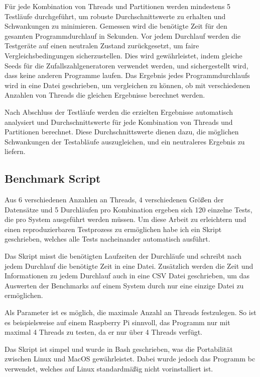 Für jede Kombination von Threads und Partitionen werden mindestens 5 Testläufe durchgeführt, um robuste Durchschnittswerte zu erhalten und Schwankungen zu minimieren. Gemessen wird die benötigte Zeit für den gesamten Programmdurchlauf in Sekunden. Vor jedem Durchlauf werden die Testgeräte auf einen neutralen Zustand zurückgesetzt, um faire Vergleichsbedingungen sicherzustellen. Dies wird gewährleistet, indem gleiche Seeds für die Zufallszahlgeneratoren verwendet werden, und sichergestellt wird, dass keine anderen Programme laufen.
Das Ergebnis jedes Programmdurchlaufs wird in eine Datei geschrieben, um vergleichen zu können, ob mit verschiedenen Anzahlen von Threads die gleichen Ergebnisse berechnet werden.

Nach Abschluss der Testläufe werden die erzielten Ergebnisse automatisch analysiert und Durchschnittswerte für jede Kombination von Threads und Partitionen berechnet. Diese Durchschnittswerte dienen dazu, die möglichen Schwankungen der Testabläufe auszugleichen, und ein neutraleres Ergebnis zu liefern.

\subsection{Benchmark Script}

Aus 6 verschiedenen Anzahlen an Threads, 4 verschiedenen Größen der Datensätze und 5 Durchläufen pro Kombination ergeben sich 120 einzelne Tests, die pro System ausgeführt werden müssen.
Um diese Arbeit zu erleichtern und einen reproduzierbaren Testprozess zu ermöglichen habe ich ein Skript geschrieben, welches alle Tests nacheinander automatisch ausführt.

Das Skript misst die benötigten Laufzeiten der Durchläufe und schreibt nach jedem Durchlauf die benötigte Zeit in eine Datei. Zusätzlich werden die Zeit und Informationen zu jedem Durchlauf auch in eine CSV Datei geschrieben, um das Auswerten der Benchmarks auf einem System durch nur eine einzige Datei zu ermöglichen.

Als Parameter ist es möglich, die maximale Anzahl an Threads festzulegen. So ist es beispielsweise auf einem Raspberry Pi sinnvoll, das Programm nur mit maximal 4 Threads zu testen, da er nur über 4 Threads verfügt.

Das Skript ist simpel und wurde in Bash geschrieben, was die Portabilität zwischen Linux und MacOS gewährleistet. Dabei wurde jedoch das Programm bc verwendet, welches auf Linux standardmäßig nicht vorinstalliert ist.

